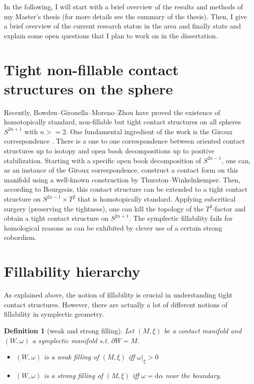 \documentclass{amsart}
\newtheorem{definition}{Definition}
\renewcommand*{\d}{\mathrm{d}}
\begin{document}
In the following, I will start with a brief overview of the results and methods of my Master's thesis (for more details see the summary of the thesis).
Then, I give a brief overview of the current research status in the area and
finally state and explain some open questions that I plan to work on in the dissertation.

\section*{Tight non-fillable contact structures on the sphere}

Recently, Bowden--Gironella--Moreno--Zhou \cite{BGMZ22} have proved the existence of homotopically standard, non-fillable but tight contact structures on all spheres $S^{2n+1}$ with $n >= 2$. 
One fundamental ingredient of the work is the Giroux correspondence \cite{Giroux02}.
There is a one to one correspondence between oriented contact structures up to isotopy
and open book decompositions up to positive stabilization.
Starting with a specific open book decomposition of $S^{2n-1}$, one can, as an instance of the Giroux correspondence, construct a contact form on this manifold using a well-known construction by Thurston--Winkelnkemper. Then, according to Bourgeois, this contact structure can be extended to a tight contact structure on $S^{2n-1}\times T^2$ that is homotopically standard.
Applying subcritical surgery (preserving the tightness), one can kill the topology of the $T^2$-factor and obtain a tight contact structure on $S^{2n+1}$.
The symplectic fillability fails for homological reasons as can be exhibited by clever use of a certain strong cobordism.

\section*{Fillability hierarchy}
As explained above, the notion of fillability is crucial in understanding tight contact structures. However, there are actually a lot of different notions of fillability in symplectic geometry.

\begin{definition}[weak and strong filling]
    Let $(M, \xi)$ be a contact manifold and $(W, \omega)$ a symplectic manifold s.t. $\partial W = M$.
    \begin{itemize}
        \item $(W, \omega)$ is a weak filling of $(M, \xi)$ iff $\omega|_\xi > 0$
        \item $(W, \omega)$ is a strong filling of $(M, \xi)$ iff $\omega = \d \alpha$ near the boundary.
    \end{itemize}
\end{definition}
\end{document}
